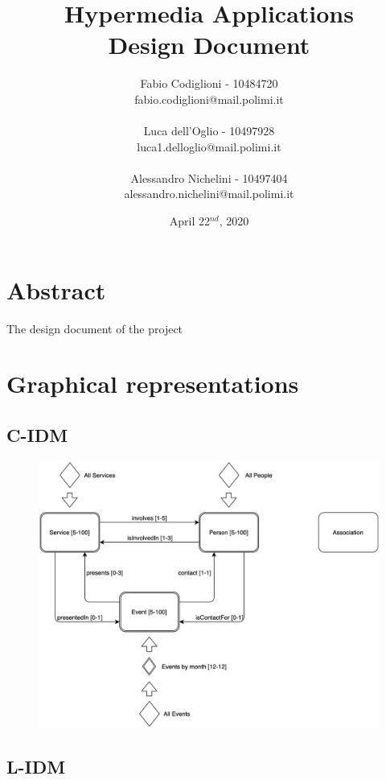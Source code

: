\documentclass[a4paper, 11pt, parskip=half, headsepline]{scrreprt}
\title{Hypermedia Applications\\Design Document}
\author{Fabio Codiglioni - 10484720\\fabio.codiglioni@mail.polimi.it\\\\Luca dell'Oglio - 10497928\\luca1.delloglio@mail.polimi.it\\\\Alessandro Nichelini - 10497404\\alessandro.nichelini@mail.polimi.it}
\date{April 22$^{nd}$, 2020}
\begin{document}
\maketitle
\tableofcontents
\newpage
{}


\chapter{Abstract}
The design document of the project

\chapter{Graphical representations}

\section{C-IDM}

\begin{figure}[H]
    \centering
    \includegraphics[width=0.85\linewidth, keepaspectratio]{IDM/C-IDM}
\end{figure}

\newpage
\section{L-IDM}
\end{document}
